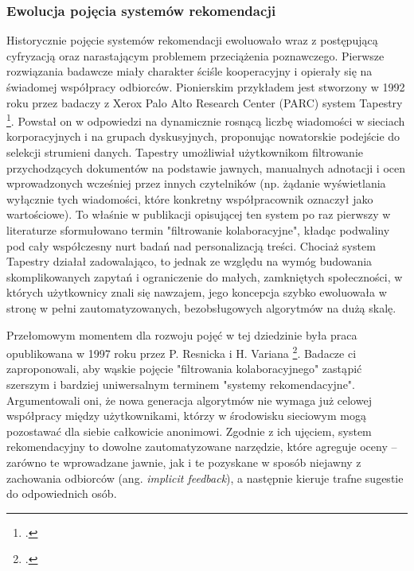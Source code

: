 \subsubsection{Ewolucja pojęcia systemów rekomendacji}

Historycznie pojęcie systemów rekomendacji ewoluowało wraz z postępującą cyfryzacją oraz narastającym problemem przeciążenia poznawczego. Pierwsze rozwiązania badawcze miały charakter ściśle kooperacyjny i opierały się na świadomej współpracy odbiorców. Pionierskim przykładem jest stworzony w 1992 roku przez badaczy z Xerox Palo Alto Research Center (PARC) system Tapestry \footcite{goldbergUsingCollaborativeFiltering1992}. Powstał on w odpowiedzi na dynamicznie rosnącą liczbę wiadomości w sieciach korporacyjnych i na grupach dyskusyjnych, proponując nowatorskie podejście do selekcji strumieni danych. Tapestry umożliwiał użytkownikom filtrowanie przychodzących dokumentów na podstawie jawnych, manualnych adnotacji i ocen wprowadzonych wcześniej przez innych czytelników (np. żądanie wyświetlania wyłącznie tych wiadomości, które konkretny współpracownik oznaczył jako wartościowe). To właśnie w publikacji opisującej ten system po raz pierwszy w literaturze sformułowano termin "filtrowanie kolaboracyjne", kładąc podwaliny pod cały współczesny nurt badań nad personalizacją treści. Chociaż system Tapestry działał zadowalająco, to jednak ze względu na wymóg budowania skomplikowanych zapytań i ograniczenie do małych, zamkniętych społeczności, w których użytkownicy znali się nawzajem, jego koncepcja szybko ewoluowała w stronę w pełni zautomatyzowanych, bezobsługowych algorytmów na dużą skalę.

Przełomowym momentem dla rozwoju pojęć w tej dziedzinie była praca opublikowana w 1997 roku przez P. Resnicka i H. Variana \footcite{RecommenderSystems1997}. Badacze ci zaproponowali, aby wąskie pojęcie "filtrowania kolaboracyjnego" zastąpić szerszym i bardziej uniwersalnym terminem "systemy rekomendacyjne". Argumentowali oni, że nowa generacja algorytmów nie wymaga już celowej współpracy między użytkownikami, którzy w środowisku sieciowym mogą pozostawać dla siebie całkowicie anonimowi. Zgodnie z ich ujęciem, system rekomendacyjny to dowolne zautomatyzowane narzędzie, które agreguje oceny -- zarówno te wprowadzane jawnie, jak i te pozyskane w sposób niejawny z zachowania odbiorców (ang. \foreignlanguage{english}{\textit{implicit feedback}}), a następnie kieruje trafne sugestie do odpowiednich osób.

